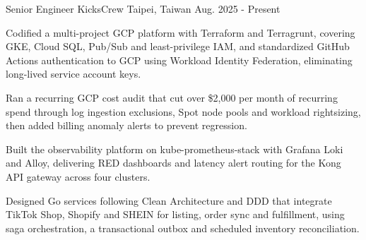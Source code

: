 

\begin{cventries}

\cventry
{Senior Engineer} %
{KicksCrew} %
{Taipei, Taiwan} %
{Aug. 2025 - Present} %
{
  \begin{cvitems} %
    \item {Codified a multi-project GCP platform with Terraform and Terragrunt, covering GKE, Cloud SQL, Pub/Sub and least-privilege IAM, and standardized GitHub Actions authentication to GCP using Workload Identity Federation, eliminating long-lived service account keys.}
    \item {Ran a recurring GCP cost audit that cut over \$2,000 per month of recurring spend through log ingestion exclusions, Spot node pools and workload rightsizing, then added billing anomaly alerts to prevent regression.}
    \item {Built the observability platform on kube-prometheus-stack with Grafana Loki and Alloy, delivering RED dashboards and latency alert routing for the Kong API gateway across four clusters.}
    \item {Designed Go services following Clean Architecture and DDD that integrate TikTok Shop, Shopify and SHEIN for listing, order sync and fulfillment, using saga orchestration, a transactional outbox and scheduled inventory reconciliation.}
  \end{cvitems}
}


\end{cventries}
